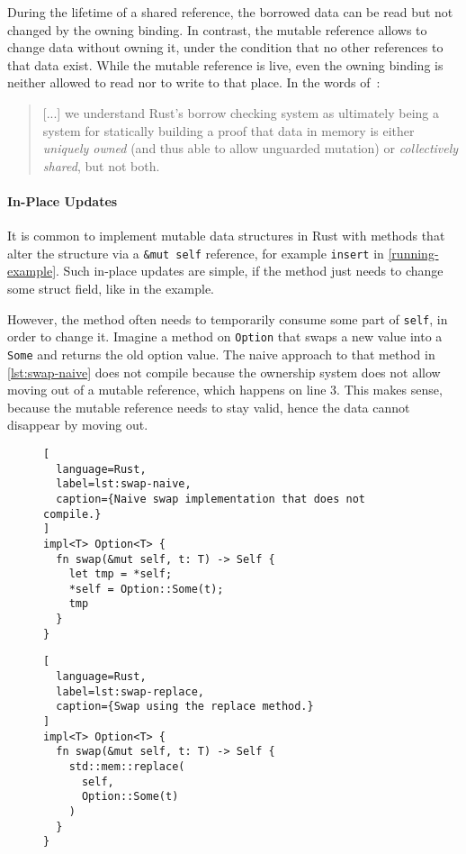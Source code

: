 During the lifetime of a shared reference, the borrowed data can be read but not
changed by the owning binding. In contrast, the mutable reference allows to
change data without owning it, under the condition that no other references to
that data exist. While the mutable reference is live, even the owning binding is
neither allowed to read nor to write to that place. In the words
of~\citet{oxide}:

\begin{quote}
{[...]} we understand Rust's borrow checking system as ultimately being a system
for statically building a proof that data in memory is either
\emph{uniquely owned} (and thus able to allow unguarded mutation) or
\emph{collectively shared}, but not both.
\end{quote}

\paragraph{In-Place Updates}

It is common to implement mutable data structures in Rust with methods that
alter the structure via a \passthrough{\lstinline!&mut self!} reference, for
example \lstinline!insert! in \autoref{running-example}. Such in-place updates
are simple, if the method just needs to change some struct field, like in the
example.

However, the method often needs to temporarily consume some part of
\lstinline!self!, in order to change it. Imagine a method on \lstinline!Option!
that swaps a new value into a \lstinline!Some! and returns the old option value.
The naive approach to that method in \autoref{lst:swap-naive} does not compile
because the ownership system does not allow moving out of a mutable reference,
which happens on line 3. This makes sense, because the mutable reference needs
to stay valid, hence the data cannot disappear by moving out.

\begin{figure}[hbt]
\noindent\begin{minipage}[t]{.48\textwidth}
\begin{lstlisting}[
  language=Rust,
  label=lst:swap-naive,
  caption={Naive swap implementation that does not compile.}
]
impl<T> Option<T> {
  fn swap(&mut self, t: T) -> Self {
    let tmp = *self;
    *self = Option::Some(t);
    tmp
  }
}
\end{lstlisting}
\end{minipage}\hfill
\begin{minipage}[t]{.48\textwidth}
\begin{lstlisting}[
  language=Rust,
  label=lst:swap-replace,
  caption={Swap using the replace method.}
]
impl<T> Option<T> {
  fn swap(&mut self, t: T) -> Self {
    std::mem::replace(
      self,
      Option::Some(t)
    )
  }
}
\end{lstlisting}
\end{minipage}
\end{figure}

